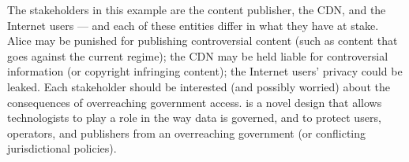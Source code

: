The stakeholders in this 
example are the content publisher, the CDN, and the Internet users --- and each of these entities differ in what 
they have at stake.  Alice may be punished for publishing controversial content (such as content that 
goes against the current regime); the CDN 
may be held liable for controversial information (or copyright infringing content); the Internet users' 
privacy could be leaked.  Each stakeholder should be interested (and possibly worried) about the 
consequences of overreaching government access.  \system{} is a novel design that allows technologists to play 
a role in the way data is governed, and to protect users, operators, and publishers from an overreaching government (or 
conflicting jurisdictional policies).
